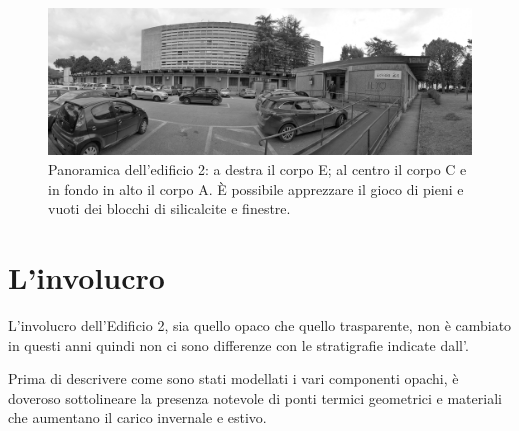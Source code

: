 \begin{figure}
	\centering
	\includegraphics[scale=0.11]{6_2_cap/img/pan}
	\caption{Panoramica dell'edificio 2: a destra il corpo E; al centro il corpo C e in fondo in alto il corpo A. È possibile apprezzare il gioco di pieni e vuoti dei blocchi di silicalcite e finestre.}\label{pan}
\end{figure}

\clearpage
\section{L'involucro}
L'involucro dell'Edificio 2, sia quello opaco che quello trasparente, non è cambiato in questi anni quindi non ci sono differenze con le stratigrafie indicate dall'.

Prima di descrivere come sono stati modellati i vari componenti opachi, è doveroso sottolineare la presenza notevole di ponti termici geometrici e materiali che aumentano il carico invernale e estivo.

